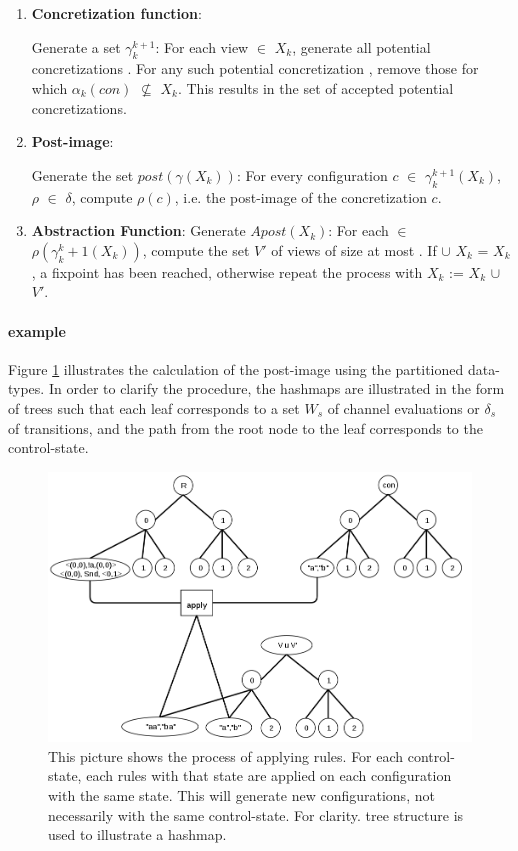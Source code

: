 \begin{enumerate}
\item
\textbf{Concretization function}:

Generate a set $\gamma_k^{k+1}$: For each view  $\in$ $X_k$, generate all potential concretizations . For any such potential concretization , remove those for which $\alpha_k(con)$ $\not\subseteq$ $X_k$. This results in the set of accepted potential concretizations.

\item
\textbf{Post-image}:

Generate the set $post(\gamma(X_k))$: For every configuration $c$ $\in$ $\gamma^{k+1}_k(X_k)$, $\rho$ $\in$ $\delta$, compute $\rho(c)$, i.e. the post-image of the concretization $c$.

\item
\textbf{Abstraction Function}:
Generate $Apost(X_k)$: For each  $\in$ $\rho(\gamma_k^k+1(X_k))$, compute the set $V'$ of views of size at most . If  $\cup$ $X_k$ = $X_k$, a fixpoint has been reached, otherwise repeat the process with $X_k$ := $X_k$ $\cup$ $V'$.
\end{enumerate}


\paragraph{example}
Figure \ref{applyrule} illustrates the calculation of the post-image using the partitioned data-types. In order to clarify the procedure, the hashmaps are illustrated in the form of trees such that each leaf corresponds to a set $W_s$ of channel evaluations or $\delta_s$ of transitions, and the path from the root node to the leaf corresponds to the control-state.

\begin{figure}
\includegraphics[width=400pt] {bilder/applyrule.png}
\caption{This picture shows the process of applying rules. For each control-state, each rules with that state are applied on each configuration with the same state. This will generate new configurations, not necessarily with the same control-state. For clarity.  tree structure is used to illustrate a hashmap.}
\label{applyrule}
\end{figure}



